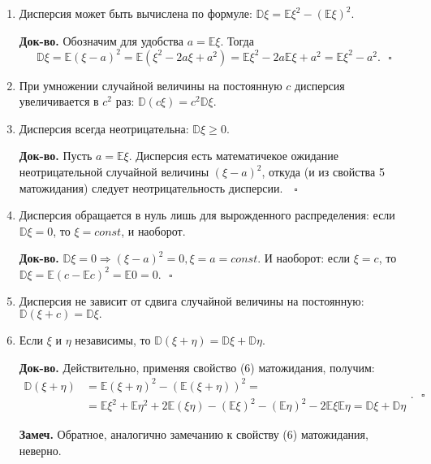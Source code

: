 \documentclass[oneside,final,14pt]{extreport}
\newcommand\mynote{{\bf Замеч.}}
\newcommand\myqed{{\bf Док-во.}}
\theoremstyle{definition}
\begin{document}
\begin{enumerate}
    \item Дисперсия может быть вычислена по формуле: $\mathbb{D}\xi = \mathbb{E}\xi^2 - (\mathbb{E}\xi)^2$.
    
    \myqed{} Обозначим для удобства $a = \mathbb{E}\xi.$ Тогда
    $$\mathbb{D} \xi=\mathbb{E}(\xi-a)^{2}=\mathbb{E}\left(\xi^{2}-2 a \xi+a^{2}\right)=\mathbb{E} \xi^{2}-2 a \mathbb{E} \xi+a^{2}=\mathbb{E} \xi^{2}-a^{2}. ~~~ \square$$
    
    \item При умножении случайной величины на постоянную $c$ дисперсия увеличивается в $c^2$ раз: $\mathbb{D}(c\xi) = c^2\mathbb{D}\xi.$
    \item Дисперсия всегда неотрицательна: $\mathbb{D}\xi \geq 0.$
    
    \myqed{} Пусть $a = \mathbb{E}\xi.$ Дисперсия есть математичекое ожидание неотрицательной случайной величины $(\xi - a)^2$, откуда (и из свойства 5 матожидания) следует неотрицательность дисперсии. $ ~~~ \square$
    
    \item Дисперсия обращается в нуль лишь для вырожденного распределения: если $\mathbb{D}\xi = 0$, то $\xi = const$, и наоборот.
    
    \myqed{} $\mathbb{D}\xi = 0 \Rightarrow (\xi - a)^2 = 0, \xi = a = const.$ И наоборот: если $\xi = c$, то $\mathbb{D} \xi=\mathbb{E}(c-\mathbb{E} c)^{2}=\mathbb{E} 0=0. ~~~ \square$
    
    \item Дисперсия не зависит от сдвига случайной величины на постоянную: $\mathbb{D}(\xi + c) = \mathbb{D}\xi.$
    
    \item Если $\xi$ и $\eta$ независимы, то $\mathbb{D}(\xi + \eta) = \mathbb{D}\xi + \mathbb{D}\eta.$
    
    \myqed{} Действительно, применяя свойство (6) матожидания, получим:
    $$\begin{aligned}
    \mathbb{D}(\xi+\eta) &=\mathbb{E}(\xi+\eta)^{2}-(\mathbb{E}(\xi+\eta))^{2}=\\
    &=\mathbb{E} \xi^{2}+\mathbb{E} \eta^{2}+2 \mathbb{E}(\xi \eta)-(\mathbb{E} \xi)^{2}-(\mathbb{E} \eta)^{2}-2 \mathbb{E} \xi \mathbb{E} \eta=\mathbb{D} \xi+\mathbb{D} \eta
    \end{aligned}. ~~~ \square$$
    
    \mynote{} Обратное, аналогично замечанию к свойству (6) матожидания, неверно.
    

\end{enumerate}
\end{document}

